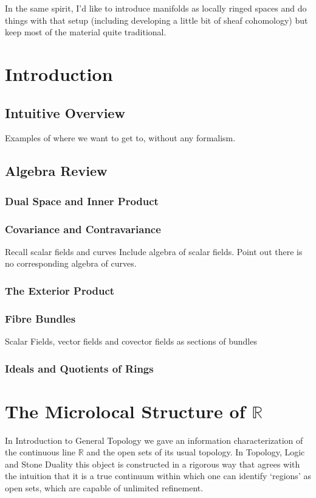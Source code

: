 \documentclass[oneside,english]{amsbook}
\numberwithin{section}{chapter}
\theoremstyle{plain}
\theoremstyle{definition}
\begin{document}
	In the same spirit, I'd like to introduce manifolds as locally ringed spaces and do things with that setup (including developing a little bit of sheaf cohomology) but keep most of the material quite traditional. 

	\chapter{Introduction}
		\section{Intuitive Overview}
			Examples of where we want to get to, without any formalism.
		\section{Algebra Review}
			\subsection{Dual Space and Inner Product}
			\subsection{Covariance and Contravariance}
			Recall scalar fields and curves
			Include algebra of scalar fields. Point out there is no corresponding algebra of curves. 
			\subsection{The Exterior Product}
			\subsection{Fibre Bundles}
			Scalar Fields, vector fields and covector fields as sections of bundles
			\subsection{Ideals and Quotients of Rings}

	
	\chapter{The Microlocal Structure of $\mathbb{R}$}
	
		In Introduction to General Topology we gave an information characterization of the continuous line $\mathbb{R}$ and the open sets of its usual topology. In Topology, Logic and Stone Duality this object is constructed in a rigorous way that agrees with the intuition that it is a true continuum within which one can identify `regions' as open sets, which are capable of unlimited refinement.
		
\end{document}
